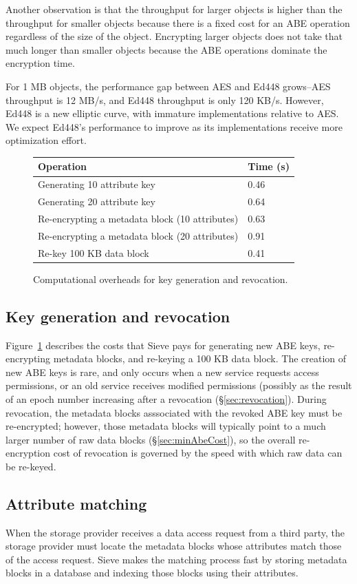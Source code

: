 Another observation is that the throughput for
larger objects is higher than the
throughput for smaller objects because
there is a fixed cost for an ABE operation regardless
of the size of the object. Encrypting larger objects
does not take that much longer than smaller
objects because the ABE operations dominate 
the encryption time.

For 1 MB objects, the performance gap between
AES and Ed448 grows--AES throughput is 12 MB/s,
and Ed448 throughput is only 120 KB/s. However,
Ed448 is a new elliptic curve, with immature
implementations relative to AES. We expect
Ed448's performance to improve as its
implementations receive more optimization
effort.
\begin{figure}
\centering
\begin{tabular}{ |p{5.5cm}|p{1.5cm}| }
\hline
Operation & Time (s)\\ \hline
Generating 10 attribute key &  0.46\\ \hline
Generating 20 attribute key & 0.64\\ \hline
Re-encrypting a metadata block (10 attributes) & 0.63 \\ \hline
Re-encrypting a metadata block (20 attributes) & 0.91 \\ \hline
Re-key 100 KB data block & 0.41 \\ \hline
\end{tabular}
\caption{Computational overheads for key generation and revocation.}
\label{fig:sievekey}
\end{figure}

\subsection{Key generation and revocation}
Figure~\ref{fig:sievekey} describes the costs
that Sieve pays for generating new ABE keys,
re-encrypting metadata blocks, and re-keying
a 100 KB data block. The creation of new ABE
keys is rare, and only occurs when a new service
requests access permissions, or an old service
receives modified permissions (possibly as the
result of an epoch number increasing after a
revocation (\S\ref{sec:revocation}). During
revocation, the metadata blocks asssociated
with the revoked ABE key must be re-encrypted;
however, those metadata blocks will typically
point to a much larger number of raw data
blocks (\S\ref{sec:minAbeCost}), so the overall
re-encryption cost of revocation is governed
by the speed with which raw data can be re-keyed.

\subsection{Attribute matching} 
When the storage
provider receives a data access request from a
third party, the storage provider must locate
the metadata blocks whose attributes match those
of the access request. Sieve makes the matching
process fast by storing metadata blocks in a
database and indexing those blocks using their
attributes.

